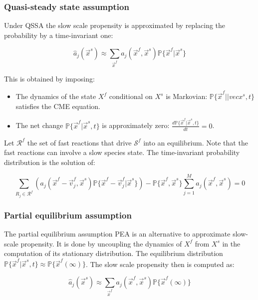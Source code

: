     \subsubsection{Quasi-steady state assumption}
    Under QSSA the slow scale propensity is approximated by replacing the probability by a time-invariant one:

    $$\hat{a}_j(\vec{x}^s)\approx\sum\limits_{\vec{x}^f}a_j(\vec{x}^f, \vec{x}^s)\mathbb{P}\{\vec{x}^f|\vec{x}^s\}$$

    This is obtained by imposing:

    \begin{multicols}{2}
      \begin{itemize}
        \item The dynamics of the state $X^f$ conditional on $X^s$ is Markovian: $\mathbb{P}\{\vec{x}^f||vec{x}^s,t\}$ satisfies the CME equation.
        \item The net change $\mathbb{P}\{\vec{x}^f|\vec{x}^s,t\}$ is approximately zero: $\frac{d\mathbb{P}\{\vec{x}^f|\vec{x}^s,t\}}{dt} = 0$.
      \end{itemize}
    \end{multicols}

    Let $\mathcal{R}^f$ the set of fast reactions that drive $\mathcal{S}^f$ into an equilibrium.
    Note that the fast reactions can involve a slow species state.
    The time-invariant probability distribution is the solution of:

    $$\sum\limits_{R_j\in\mathcal{R}^f}(a_j(\vec{x}^f-\vec{v}_j^f,\vec{x}^s)\mathbb{P}\{\vec{x}^f-\vec{v}_j^f|\vec{x}^s\})-\mathbb{P}\{\vec{x}^f,\vec{x}^s\}\sum\limits_{j=1}^Ma_j(\vec{x}^f,\vec{x}^s) = 0$$

    \subsubsection{Partial equilibrium assumption}
    The partial equilibrium assumption PEA is an alternative to approximate slow-scale propensity.
    It is done by uncoupling the dynamics of $X^f$ from $X^s$ in the computation of its stationary distribution.
    The equilibrium distribution $\mathbb{P}\{\vec{x}^f|\vec{x}^s,t\}\approx\mathbb{P}\{\vec{x}^f(\infty)\}$.
    The slow scale propensity then is computed as:

    $$\hat{a}_j(\vec{x}^s)\approx\sum\limits_{\vec{x}^f}a_j(\vec{x}^f, \vec{x}^s)\mathbb{P}\{\vec{x}^f(\infty)\}$$

